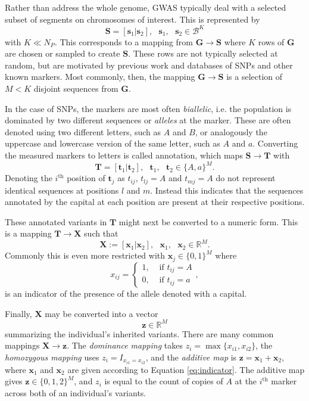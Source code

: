 \documentclass{article}
\newcommand{\ve}[1]{\mathbf{#1}}           %
\newcommand{\m}[1]{\mathbf{#1}}               %
\newcommand{\field}[1]{\mathbb{#1}}
\newcommand{\Reals}{\field{R}}
\begin{document}
Rather than address the whole genome, GWAS typically deal with a selected subset of segments on chromosomes of interest. This is represented by
$$\m{S} = [\ve{s}_1 | \ve{s}_2], \text{ } \ve{s}_1, \text{ } \ve{s}_2 \in \mathcal{B}^K$$
with $K \ll N_P$. This corresponds to a mapping from $\m{G} \rightarrow \m{S}$ where $K$ rows of $\m{G}$ are chosen or sampled to create $\m{S}$. These rows are not typically selected at random, but are motivated by previous work and databases of SNPs and other known markers. Most commonly, then, the mapping $\m{G} \rightarrow \m{S}$ is a selection of $M < K$ disjoint sequences from $\m{G}$. 

In the case of SNPs, the markers are most often \textit{biallelic}, i.e. the population is dominated by two different sequences or \textit{alleles} at the marker. These are often denoted using two different letters, such as $A$ and $B$, or analogously the uppercase and lowercase version of the same letter, such as $A$ and $a$. Converting the measured markers to letters is called annotation, which maps $\m{S} \rightarrow \m{T}$ with
$$\m{T} = [\ve{t}_1 | \ve{t}_2], \text{ } \ve{t}_1, \text{ } \ve{t}_2 \in \{A,a\}^M.$$
Denoting the $i^{\text{th}}$ position of $\ve{t}_j$ as $t_{ij}$, $t_{lj} = A$ and $t_{mj} = A$ do not represent identical sequences at positions $l$ and $m$. Instead this indicates that the sequences annotated by the capital at each position are present at their respective positions.

These annotated variants in $\m{T}$ might next be converted to a numeric form. This is a mapping $\m{T} \rightarrow \m{X}$ such that
$$\m{X} := [\ve{x}_1 | \ve{x}_2], \text{ } \ve{x}_1, \text{ } \ve{x}_2 \in \Reals^M.$$
Commonly this is even more restricted with $\ve{x}_j \in \{0,1\}^M$ where
\begin{equation} \label{eq:indicator}
x_{ij} = \begin{cases}
  1, & \text{ if } t_{ij} = A \\
  0, & \text{ if } t_{ij} = a
\end{cases},
\end{equation}
is an indicator of the presence of the allele denoted with a capital.

Finally, $\m{X}$ may be converted into a vector
$$\ve{z} \in \Reals^M$$
summarizing the individual's inherited variants. There are many common mappings $\m{X} \rightarrow \ve{z}$. The \textit{dominance mapping} takes $z_i = \max\{x_{i1}, x_{i2}\}$, the \textit{homozygous mapping} uses $z_i = I_{x_{i1} = x_{i2}}$, and the \textit{additive map} is $\ve{z} = \ve{x}_1 + \ve{x}_2$, where $\ve{x}_1$ and $\ve{x}_2$ are given according to Equation \ref{eq:indicator}. The additive map gives $\ve{z} \in \{0,1,2\}^M$, and $z_i$ is equal to the count of copies of $A$ at the $i^{\text{th}}$ marker across both of an individual's variants.
\end{document}
